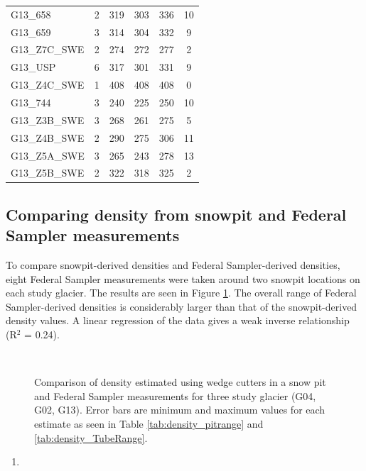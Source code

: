 \documentclass[12pt]{article}
\begin{document}
\begin{table}[]
\begin{tabular}{lccccc}
G13\_658 & 2 & 319 & 303 & 336 & 10 \\
G13\_659 & 3 & 314 & 304 & 332 & 9 \\
G13\_Z7C\_SWE & 2 & 274 & 272 & 277 & 2 \\
G13\_USP & 6 & 317 & 301 & 331 & 9 \\
G13\_Z4C\_SWE & 1 & 408 & 408 & 408 & 0 \\
G13\_744 & 3 & 240 & 225 & 250 & 10 \\
G13\_Z3B\_SWE & 3 & 268 & 261 & 275 & 5 \\
G13\_Z4B\_SWE & 2 & 290 & 275 & 306 & 11 \\
G13\_Z5A\_SWE & 3 & 265 & 243 & 278 & 13 \\
G13\_Z5B\_SWE & 2 & 322 & 318 & 325 & 2
\end{tabular}
\end{table}



\subsection*{Comparing density from snowpit and Federal Sampler measurements}

To compare snowpit-derived densities and Federal Sampler-derived densities, eight Federal Sampler measurements were taken around two snowpit locations on each study glacier. The results are seen in Figure \ref{fig:density_pitVStube}. The overall range of Federal Sampler-derived densities is considerably larger than that of the snowpit-derived density values. A linear regression of the data gives a weak inverse relationship (R$^2$ = 0.24).

\begin{figure} 
	\centering
	\\
	\caption{Comparison of density estimated using wedge cutters in a snow pit and Federal Sampler measurements for three study glacier (G04, G02, G13). Error bars are minimum and maximum values for each estimate as seen in Table \ref{tab:density_pitrange} and \ref{tab:density_TubeRange}.}
	\label{fig:density_pitVStube}
\end{figure}




\begin{enumerate}
\item 
\end{enumerate}
\end{document}
